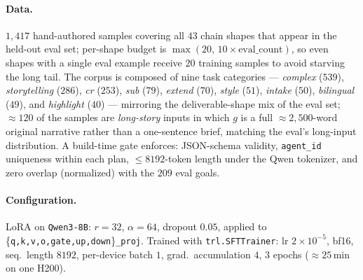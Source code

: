 \paragraph{Data.}
$1{,}417$ hand-authored samples covering all $43$ chain shapes that
appear in the held-out eval set; per-shape budget is
$\max(20,\,10\!\times\!\text{eval\_count})$, so even shapes with a
single eval example receive $20$ training samples to avoid starving
the long tail. The corpus is composed of nine task categories —
\emph{complex} ($539$), \emph{storytelling} ($286$), \emph{cr}
($253$), \emph{sub} ($79$), \emph{extend} ($70$), \emph{style}
($51$), \emph{intake} ($50$), \emph{bilingual} ($49$), and
\emph{highlight} ($40$) — mirroring the deliverable-shape mix of
the eval set; $\approx 120$ of the samples are \emph{long-story}
inputs in which $g$ is a full $\approx 2{,}500$-word original
narrative rather than a one-sentence brief, matching the eval's
long-input distribution. A build-time gate enforces: JSON-schema
validity, \texttt{agent\_id} uniqueness within each plan,
$\le 8192$-token length under the Qwen tokenizer, and zero overlap
(normalized) with the $209$ eval goals.

\paragraph{Configuration.}
LoRA on \texttt{Qwen3-8B}: $r=32$, $\alpha=64$,
dropout $0.05$, applied to
\{\texttt{q,k,v,o,gate,up,down}\}\texttt{\_proj}.
Trained with \texttt{trl.SFTTrainer}: lr $2\!\times\!10^{-5}$, bf16,
seq.\ length $8192$, per-device batch $1$, grad.\ accumulation $4$,
$3$ epochs ($\approx 25$\,min on one H200).
